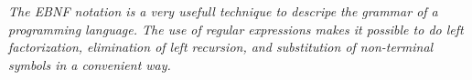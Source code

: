 \vspace{30pt}

\textit{The EBNF notation is a very usefull technique to descripe the grammar of a programming language. The use of regular expressions makes it possible to do left factorization, elimination of left recursion, and substitution of non-terminal symbols in a convenient way.\\ \indent
}